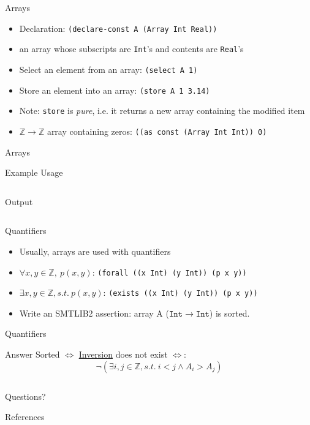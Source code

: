 \documentclass[10pt]{beamer}
\begin{document}
\begin{frame}{Arrays}
  \begin{itemize}[<+->]
    \item Declaration: \texttt{(declare-const A (Array Int Real))}
    \item an array whose subscripts are \texttt{Int}'s and contents are \texttt{Real}'s
    \item Select an element from an array: \texttt{(select A 1)}
    \item Store an element into an array: \texttt{(store A 1 3.14)}
    \item \alert{Note:} \texttt{store} is \emph{pure}, i.e. it returns a new array containing the modified item
    \item $\mathbb{Z}\to\mathbb{Z}$ array containing zeros: \texttt{((as const (Array Int Int)) 0)}
    \end{itemize}
\end{frame}

\begin{frame}[fragile]{Arrays}
  \begin{exampleblock}{Example Usage}
    \inputminted[mathescape=true]{lisp}{./src/ex7.smt2}
    \pause
    \alert{Output}
    \inputminted[mathescape=true]{lisp}{./src/ex7-out.smt2}
  \end{exampleblock}
\end{frame}

\begin{frame}{Quantifiers}
  \begin{itemize}[<+->]
    \item Usually, arrays are used with quantifiers
    \item $\forall x,y \in \mathbb{Z},\: p(x,y)$: \texttt{(forall ((x Int) (y Int)) (p x y))}
    \item $\exists x,y \in \mathbb{Z},s.t.\: p(x,y)$: \texttt{(exists ((x Int) (y Int)) (p x y))}
    \item Write an SMTLIB2 assertion: array A ($\mathtt{Int} \to \mathtt{Int}$) is sorted.
  \end{itemize}
\end{frame}

\begin{frame}[fragile]{Quantifiers}
  \begin{alertblock}{Answer}
    \vspace{4pt}
    Sorted $\Leftrightarrow$ \href{https://en.wikipedia.org/wiki/Inversion_(discrete_mathematics)}{Inversion} does not exist $\Leftrightarrow$:
    \begin{equation*}
      \neg(\exists i, j \in \mathbb{Z}, s.t.\: i < j \land A_i > A_j)
    \end{equation*}
    \inputminted{lisp}{./src/ex8.smt2}
  \end{alertblock}
\end{frame}

\begin{frame}[standout]
  Questions?
\end{frame}

\begin{frame}[allowframebreaks]{References}
  
  
\end{frame}
\end{document}
